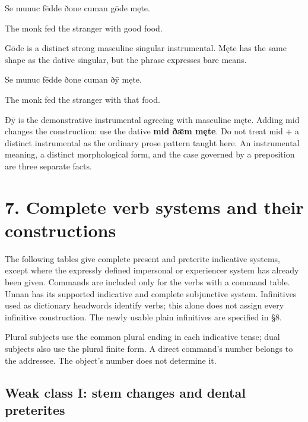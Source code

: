 Se munuc fēdde ðone cuman gōde męte.

The monk fed the stranger with good food.

Gōde is a distinct strong masculine singular instrumental. Męte has the same shape as the dative singular, but the phrase expresses bare means.

Se munuc fēdde ðone cuman ðȳ męte.

The monk fed the stranger with that food.

Ðȳ is the demonstrative instrumental agreeing with masculine męte. Adding mid changes the construction: use the dative \textbf{mid ðǣm męte}. Do not treat mid + a distinct instrumental as the ordinary prose pattern taught here. An instrumental meaning, a distinct morphological form, and the case governed by a preposition are three separate facts.

\section*{7. Complete verb systems and their constructions}

The following tables give complete present and preterite indicative systems, except where the expressly defined impersonal or experiencer system has already been given. Commands are included only for the verbs with a command table. Unnan has its supported indicative and complete subjunctive system. Infinitives used as dictionary headwords identify verbs; this alone does not assign every infinitive construction. The newly usable plain infinitives are specified in §8.

Plural subjects use the common plural ending in each indicative tense; dual subjects also use the plural finite form. A direct command's number belongs to the addressee. The object's number does not determine it.

\subsection*{Weak class I: stem changes and dental preterites}

